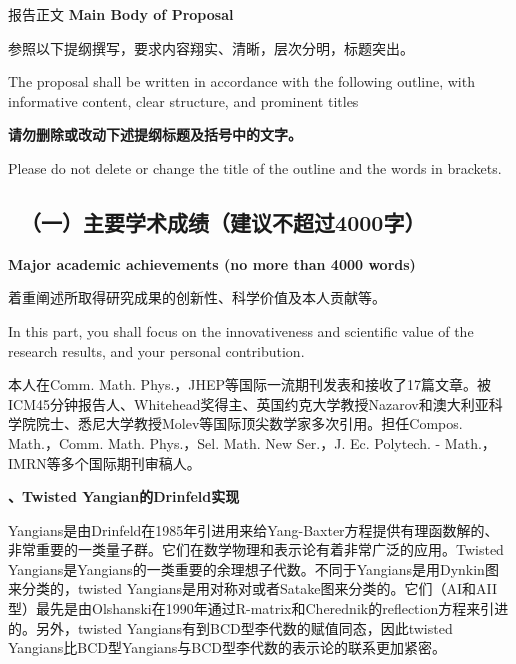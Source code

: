 \documentclass[12pt,UTF8,AutoFakeBold=4,a4paper]{ctexart}
\begin{document}
\begin{center}
{\sanhao {} 报告正文 
\bfseries {} Main Body of Proposal}
\end{center}

{\sihao \kaishu  
参照以下提纲撰写，要求内容翔实、清晰，层次分明，标题突出。}

{\sihao {} The proposal shall be written in accordance 
with the following outline, with informative content, clear structure, 
and prominent titles}

{\sihao \kaishu \color{MsBlue} \bfseries 请勿删除或改动下述提纲标题及括号中的文字。}

{\sihao \color{MsBlue}  Please do not delete or 
change the title of the outline and the words in brackets.}



{\color{MsBlue} \subsection{\sihao \kaishu \quad \ 
\textbf{（一）主要学术成绩}（建议不超过4000字）}}

{\color{MsBlue} \xiaosihao {} 
\textbf{Major academic achievements (no more than 4000 words)}}

{\sihao \kaishu \color{MsBlue} 着重阐述所取得研究成果的创新性、科学价值及本人贡献等。}

{\color{MsBlue} \xiaosihao {} In this part, you shall 
focus on the innovativeness and scientific value of the research results, 
and your personal contribution.}

% 
% 


本人在Comm. Math. Phys.，JHEP等国际一流期刊发表和接收了17篇文章。被ICM45分钟报告人、Whitehead奖得主、英国约克大学教授Nazarov和澳大利亚科学院院士、悉尼大学教授Molev等国际顶尖数学家多次引用。担任Compos. Math.，Comm. Math. Phys.，Sel. Math. New Ser.，J. Ec. Polytech. - Math.，IMRN等多个国际期刊审稿人。

\textbf{、Twisted Yangian的Drinfeld实现}

Yangians是由Drinfeld在1985年引进用来给Yang-Baxter方程提供有理函数解的、非常重要的一类量子群。它们在数学物理和表示论有着非常广泛的应用。Twisted Yangians是Yangians的一类重要的余理想子代数。不同于Yangians是用Dynkin图来分类的，twisted Yangians是用对称对或者Satake图来分类的。它们（AI和AII型）最先是由Olshanski在1990年通过R-matrix和Cherednik的reflection方程来引进的。另外，twisted Yangians有到BCD型李代数的赋值同态，因此twisted Yangians比BCD型Yangians与BCD型李代数的表示论的联系更加紧密。
\end{document}
